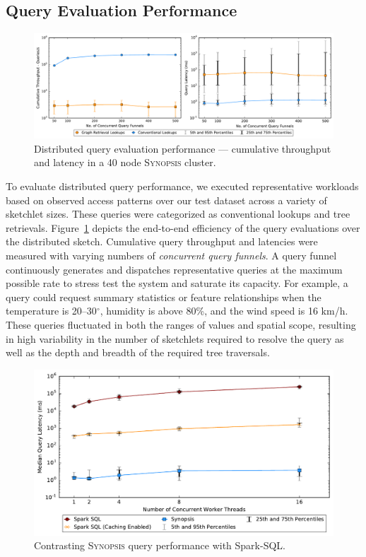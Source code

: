 \subsection{Query Evaluation Performance}
\begin{figure}
    \centerline{\includegraphics[width=\linewidth]{figures/query_benchmark_both.pdf}}
    \caption{Distributed query evaluation performance --- cumulative throughput and latency in a 40 node \textsc{Synopsis} cluster.}
    \label{fig:dist-query}
\end{figure}
To evaluate distributed query performance, we executed representative workloads based on observed access patterns over our test dataset across a variety of sketchlet sizes. These queries were categorized as conventional lookups and tree retrievals.  Figure~\ref{fig:dist-query} depicts the end-to-end efficiency of the query evaluations over the distributed sketch.
Cumulative query throughput and latencies were measured with varying numbers of \emph{concurrent query funnels}.
A query funnel continuously generates and dispatches representative queries at the maximum possible rate to stress test the system and saturate its capacity. For example, a query could request summary statistics or feature relationships when the temperature is 20--30$^{\circ}$, humidity is above 80\%, and the wind speed is 16 km/h.
These queries fluctuated in both the ranges of values and spatial scope, resulting in high variability in the number of sketchlets required to resolve the query as well as the depth and breadth of the required tree traversals.
%
\begin{figure}
    \centerline{\includegraphics[width=\linewidth]{figures/spark-sql-query-complete.pdf}}
    \caption{Contrasting \textsc{Synopsis} query performance with Spark-SQL.}
    \label{fig:spark-sql-query}
\end{figure}
%

